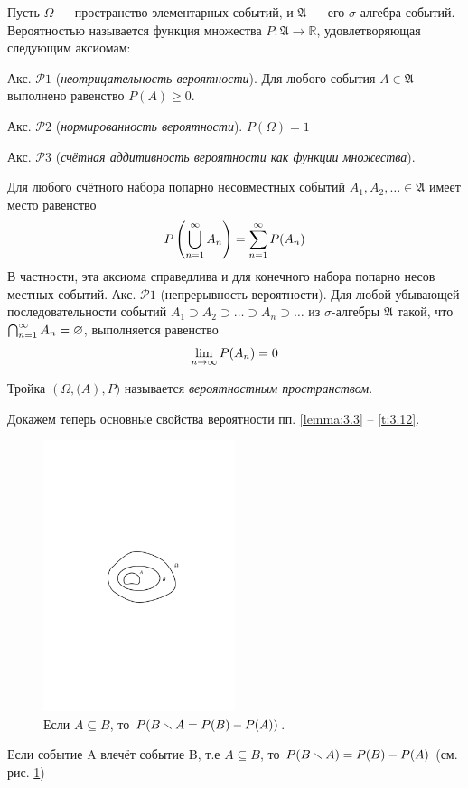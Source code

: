 
\begin{definition}
	Пусть $\Omega$ — пространство элементарных событий, и
$\mathfrak{A}$ — его $\sigma$-алгебра событий. Вероятностью называется функция множества
$P: \mathfrak{A}\rightarrow \mathbb{R}$, удовлетворяющая следующим аксиомам:

Акс. $\mathcal{P}1$ (\textit{неотрицательность вероятности}). Для любого события $A\in\mathfrak{A}$ выполнено равенство $P(A)\geqslant 0$.

Акс. $\mathcal{P}2$ (\textit{нормированность вероятности}). $P(\Omega)=1$ 

Акс. $\mathcal{P}3$ (\textit{счётная аддитивность вероятности как функции множества}).
\end{definition}
Для любого счётного набора попарно несовместных событий \newline $A_1,A_2,\dots\in 
\mathfrak{A}$
имеет место равенство
\begin{equation}
	P\left(\bigcup_{n=1}^{\infty}A_n \right)=\sum^{\infty}_{n=1}P(A_n) \notag
\end{equation}
В частности, эта аксиома справедлива и для конечного набора попарно несов
местных событий.
Акс. $\mathcal{P}1$ (непрерывность вероятности). Для любой убывающей последовательности событий $A_1 \supset A_2 \supset\dots\supset A_n \supset \dots$ из $\sigma$-алгебры $\mathfrak{A}$ такой, что $\bigcap_{n=1}^{\infty}A_n=\varnothing$,
выполняется равенство
\begin{equation}
	\lim\limits_{n\to\infty}P(A_n)=0 \notag
\end{equation}
\begin{definition}
	Тройка $(\Omega,\mathfrak(A),P)$ называется \textit{вероятностным пространством}.
\end{definition}
Докажем теперь основные свойства вероятности пп. \ref{lemma:3.3} – \ref{t:3.12}.

\begin{figure}[h!]
	\centering
	\includegraphics[width=0.5\textwidth]{pic/pic2.pdf}
	\caption{Если $A\subseteq B$, то $P(B\smallsetminus A=P(B)-P(A))$.}
	\label{fig2}
\end{figure}
\begin{lemma}
	\label{lemma:3.3}
	Если событие A влечёт событие B, т.е $A\subseteq B$, то $P(B\smallsetminus A)=P(B)-P(A)$ (см. рис. \ref{fig2})
\end{lemma}

